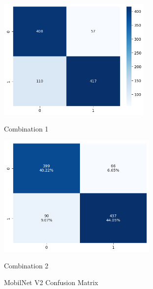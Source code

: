 \begin{figure}[H]
    \centering
    \begin{minipage}[b]{0.49\textwidth}
        \centering
        \includegraphics[width=\textwidth, height=6cm]{Figures/balanced_data/less_data/withoutbn/mn2/cm.png}
        \captionsetup{labelformat=empty}
        \caption{Combination 1}
        \label{fig:u_wo_r_cm}
    \end{minipage}
    \hfill
    \begin{minipage}[b]{0.49\textwidth}
        \centering
        \includegraphics[width=\textwidth, height=6cm]{Figures/balanced_data/less_data/withbn/mn2/cm.png}
        \captionsetup{labelformat=empty}
        \caption{Combination 2}
        \label{fig:u_w_r_cm}
    \end{minipage}
    \captionsetup{labelformat=default}
    \caption{MobilNet V2 Confusion Matrix}
\end{figure}

